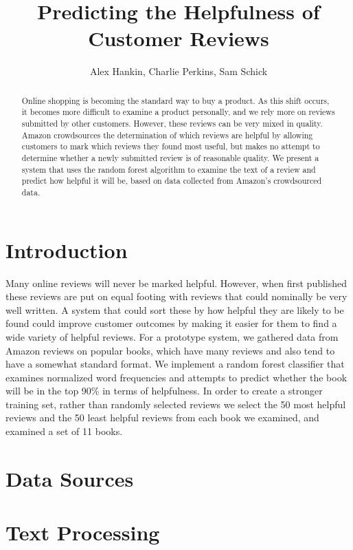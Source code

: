 \documentclass[twocolumn]{article}
\title{Predicting the Helpfulness of Customer Reviews}
\author{Alex Hankin, Charlie Perkins, Sam Schick}
\date{}
\begin{document}
\maketitle

\begin{abstract}
	Online shopping is becoming the standard way to buy a product. As this shift occurs, it becomes more difficult to examine a product personally, and we rely more on reviews submitted by other customers. However, these reviews can be very mixed in quality. Amazon crowdsources the determination of which reviews are helpful by allowing customers to mark which reviews they found most useful, but makes no attempt to determine whether a newly submitted review is of reasonable quality. We present a system that uses the random forest algorithm to examine the text of a review and predict how helpful it will be, based on data collected from Amazon's crowdsourced data.
\end{abstract}
\section{Introduction}
	Many online reviews will never be marked helpful. However, when first published these reviews are put on equal footing with reviews that could nominally be very well written. A system that could sort these by how helpful they are likely to be found could improve customer outcomes by making it easier for them to find a wide variety of helpful reviews. For a prototype system, we gathered data from Amazon reviews on popular books, which have many reviews and also tend to have a somewhat standard format. We implement a random forest classifier that examines normalized word frequencies and attempts to predict whether the book will be in the top 90\% in terms of helpfulness. In order to create a stronger training set, rather than randomly selected reviews we select the 50 most helpful reviews and the 50 least helpful reviews from each book we examined, and examined a set of 11
	books.

\section{Data Sources}

\section{Text Processing}
\end{document}
